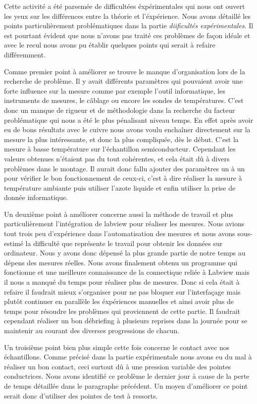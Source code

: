 Cette activité a été parsemée de difficultées éxpérimentales qui nous ont ouvert les yeux sur les différences entre la théorie et l'éxpérience. Nous avons détaillé les points particulièrement problématiques dans la partie \emph{diificultés expérimentales}. Il est pourtant évident que nous n'avons pas traité ces problèmes de façon idéale et avec le recul nous avons pu établir quelques points qui serait à refaire différemment.


Comme premier point à améliorer se trouve le manque d'organisation lors de la recherche de problème. Il y avait différents paramètres qui pouvaient avoir une forte influence sur la mesure comme par exemple l'outil informatique, les instruments de mesures, le câblage ou encore les sondes de températures. C'est donc un manque de rigueur et de méthodologie dans la recherche du facteur problématique qui nous a été le plus pénalisant niveau temps. En effet après avoir eu de bons résultats avec le cuivre nous avons voulu enchaîner directement sur la mesure la plus intéressante, et donc la plus compliquée, dès le début. C'est la mesure à basse température sur l'échantillon semiconducteur. Cependant les valeurs obtenues n'étaient pas du tout cohérentes, et cela était dû à divers problèmes dans le montage. Il aurait donc fallu ajouter des paramètres un à un pour vérifier le bon fonctionnement de ceux-ci, c'est à dire réaliser la mesure à température ambiante puis utiliser l'azote liquide et enfin utiliser la prise de donnée informatique. 

Un deuxième point à améliorer concerne aussi la méthode de travail et plus particulièrement l'intégration de labview pour réaliser les mesures. Nous avions tout trois peu d'expérience dans l'automatisation des mesures et nous avons sous-estimé la difficulté que représente le travail pour obtenir les données sur ordinateur. Nous y avons donc dépensé la plus grande partie de notre temps au dépens des mesures réelles. Nous avons finalement obtenu un programme qui fonctionne et une meilleure connaissance de la connectique reliée à Labview mais il nous a manqué du temps pour réaliser plus de mesures. Donc si cela était à refaire il faudrait mieux s'organiser pour ne pas bloquer sur l'interfaçage mais plutôt continuer en parallèle les éxpériences manuelles et ainsi avoir plus de temps pour résoudre les problèmes qui proviennent de cette partie. Il faudrait cependant réaliser un bon débriefing à plusieurs reprises dans la journée pour se maintenir au courant des diverses progressions de chacun. 

Un troisième point bien plus simple cette fois concerne le contact avec nos échantillons. Comme précisé dans la partie expérimentale nous avons eu du mal à réaliser un bon contact, ceci surtout dû à une pression variable des pointes conductrices. Nous avons identifié ce problème le dernier jour à cause de la perte de temps détaillée dans le paragraphe précédent.  Un moyen d'améliorer ce point serait donc d'utiliser des pointes de test à ressorts.
